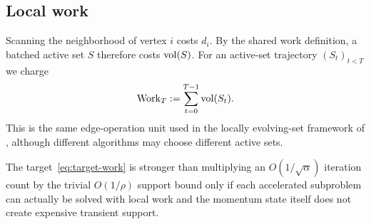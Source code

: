 \subsection{Local work}

Scanning the neighborhood of vertex $i$ costs $d_i$. By the shared work
definition, a batched active set $S$ therefore costs $\operatorname{vol}(S)$.
For an active-set trajectory $(S_t)_{t<T}$ we charge
\begin{equation}
  \operatorname{Work}_T:=\sum_{t=0}^{T-1}\operatorname{vol}(S_t).
  \label{eq:work-model}
\end{equation}
This is the same edge-operation unit used in the locally evolving-set
framework of \citet{zhou2024iterative}, although different algorithms may
choose different active sets.

The target~\eqref{eq:target-work} is stronger than multiplying an
$O(1/\sqrt\alpha)$ iteration count by the trivial $O(1/\rho)$ support bound
only if each accelerated subproblem can actually be solved with local work and
the momentum state itself does not create expensive transient support.

